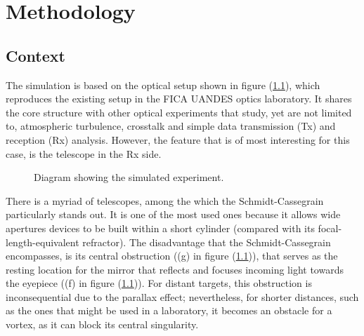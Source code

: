 \chapter{Methodology} \label{Procedure}
\label{c3} %

\section{Context}
\label{c3:Methodology:Context}
The simulation is based on the optical setup shown in figure (\ref{fig:Simulated_Experiment}), which reproduces the existing setup in the FICA UANDES optics laboratory. It shares the core structure with other optical experiments that study, yet are not limited to, atmospheric turbulence, crosstalk and simple data transmission (Tx) and reception (Rx) analysis. However, the feature that is of most interesting for this case, is the telescope in the Rx side.

\begin{figure}[htbp]
    \centering
    \caption{Diagram showing the simulated experiment.}
    \label{fig:Simulated_Experiment}
\end{figure}

\newpage
There is a myriad of telescopes, among the which the Schmidt-Cassegrain particularly stands out. It is one of the most used ones because it allows wide apertures devices to be built within a short cylinder (compared with its focal-length-equivalent refractor). The disadvantage that the Schmidt-Cassegrain encompasses, is its central obstruction ((g) in figure (\ref{fig:Simulated_Experiment})), that serves as the resting location for the mirror that reflects and focuses incoming light towards the eyepiece ((f) in figure (\ref{fig:Simulated_Experiment})). For distant targets, this obstruction is inconsequential due to the parallax effect; nevertheless, for shorter distances, such as the ones that might be used in a laboratory, it becomes an obstacle for a vortex, as it can block its central singularity.

